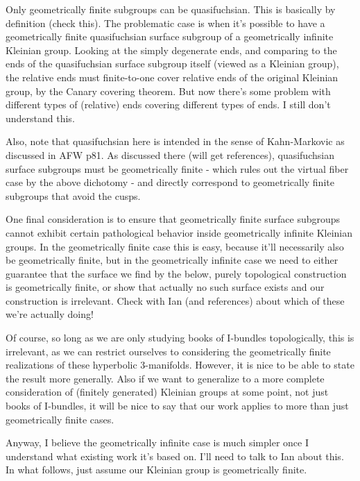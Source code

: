 \documentclass[12pt]{amsart}
\theoremstyle{definition}
\theoremstyle{remark}
\begin{document}

Only geometrically finite subgroups can be quasifuchsian. This is basically by
definition (check this). The problematic case is when it's possible to have
a geometrically finite quasifuchsian surface subgroup of a geometrically
infinite Kleinian group. Looking at the simply degenerate ends, and comparing
to the ends of the quasifuchsian surface subgroup itself (viewed as a Kleinian
group), the relative ends must finite-to-one cover relative ends of the
original Kleinian group, by the Canary covering theorem. But now there's some
problem with different types of (relative) ends covering different types of
ends. I still don't understand this.

Also, note that quasifuchsian here is intended in the sense of Kahn-Markovic as
discussed in AFW p81. As discussed there (will get references), quasifuchsian
surface subgroups must be geometrically finite - which rules out the virtual
fiber case by the above dichotomy - and directly correspond to geometrically
finite subgroups that avoid the cusps.

One final consideration is to ensure that geometrically finite surface
subgroups cannot exhibit certain pathological behavior inside geometrically
infinite Kleinian groups. In the geometrically finite case this is easy,
because it'll necessarily also be geometrically finite, but in the
geometrically infinite case we need to either guarantee that the surface we
find by the below, purely topological construction is geometrically finite, or
show that actually no such surface exists and our construction is irrelevant.
Check with Ian (and references) about which of these we're actually doing!

Of course, so long as we are only studying books of I-bundles topologically,
this is irrelevant, as we can restrict ourselves to considering the
geometrically finite realizations of these hyperbolic 3-manifolds. However, it
is nice to be able to state the result more generally. Also if we want to
generalize to a more complete consideration of (finitely generated) Kleinian
groups at some point, not just books of I-bundles, it will be nice to say that
our work applies to more than just geometrically finite cases.

Anyway, I believe the geometrically infinite case is much simpler once
I understand what existing work it's based on. I'll need to talk to Ian about
this. In what follows, just assume our Kleinian group is geometrically finite.
\end{document}
